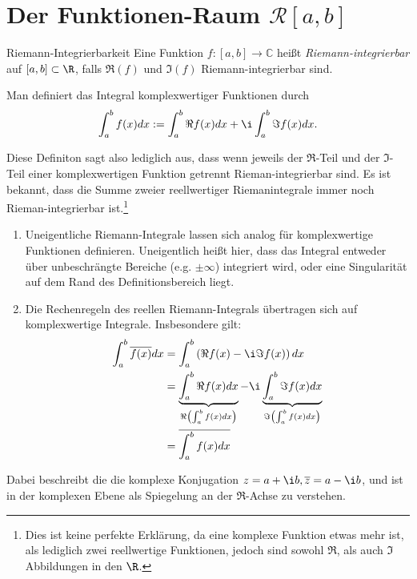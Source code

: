 \section{Der Funktionen-Raum $\mathcal{R}[a,b]$}
\label{sec:1.1}

\begin{definition}{Riemann-Integrierbarkeit}
    Eine Funktion $f : [a,b] \to \mathbb{C}$ heißt \emph{Riemann-integrierbar} auf $[a,b] \subset \R$,
    falls $\Re(f)$ und $\Im(f)$ Riemann-integrierbar sind.

    Man definiert das Integral komplexwertiger Funktionen durch
    $$
    \int_a^b f(x)dx
    := \int_a^b \Re f(x)dx + \i \int_a^b \Im f(x)dx.
    $$
\end{definition}

Diese Definiton sagt also lediglich aus, dass wenn jeweils der $\Re$-Teil und der $\Im$-Teil einer komplexwertigen Funktion getrennt Rieman-integrierbar sind.
Es ist bekannt, dass die Summe zweier reellwertiger Riemanintegrale immer noch Rieman-integrierbar ist.\footnote{Dies ist keine perfekte Erklärung, da eine komplexe Funktion etwas mehr ist, als lediglich zwei reellwertige Funktionen, jedoch sind sowohl $\Re$, als auch $\Im$ Abbildungen in den $\R$.}

\begin{bemerkungbox}
    \begin{enumerate}
        \item Uneigentliche Riemann-Integrale lassen sich analog für komplexwertige Funktionen definieren.
            Uneigentlich heißt hier, dass das Integral entweder über unbeschrängte Bereiche (e.g. $\pm \infty$) integriert wird, oder eine Singularität auf dem Rand des Definitionsbereich liegt. 
        \item Die Rechenregeln des reellen Riemann-Integrals übertragen sich auf komplexwertige Integrale.
        Insbesondere gilt:
        $$
        \begin{aligned}
        \int_{a}^{b} \overline{f(x)}dx &= \int_{a}^{b} \left(\Re f(x) - \i\Im f(x)\right) dx \\
            &= \underbrace{\int_{a}^{b} \Re f(x) dx}_{\Re\left(\int_{a}^{b}f(x)dx\right)}  -  \i  \underbrace{\int_{a}^{b} \Im f(x) dx}_{\Im\left(\int_{a}^{b}f(x)dx\right)}  \\
            &= \overline{\int_{a}^{b}f(x)dx}
        \end{aligned}
        $$
    \end{enumerate}

    Dabei beschreibt die die komplexe Konjugation $z = a + \i b, \overline{z} = a - \i b$, und ist in der komplexen Ebene als Spiegelung an der $\Re$-Achse zu verstehen.
\end{bemerkungbox}

